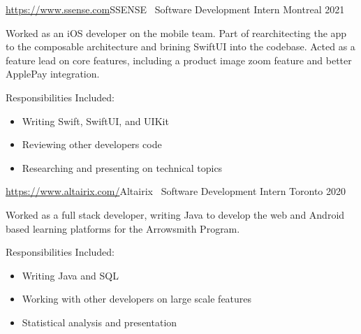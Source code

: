 \documentclass[]{style}
\begin{document}
\begin{entrylist}


\vspace{2mm}

\entry
{\url{https://www.ssense.com}{SSENSE} \ {\normalfont Software Development Intern}\vspace{1mm}}
{Montreal 2021}
{Worked as an iOS developer on the mobile team. Part of rearchitecting the app to the composable architecture and brining SwiftUI into the codebase. Acted as a feature lead on core features, including a product image zoom feature and better ApplePay integration.
~ \vspace{1mm}

Responsibilities Included:

\begin{itemize}
	\item Writing Swift, SwiftUI, and UIKit
	\item Reviewing other developers code
	\item Researching and presenting on technical topics
\end{itemize}}


\vspace{2mm}

\entry
{\url{https://www.altairix.com/}{Altairix} \ {\normalfont Software Development Intern} \vspace{1mm}}
{Toronto 2020}
{Worked as a full stack developer, writing Java to develop the web and Android based learning platforms for the Arrowsmith Program.
~ \vspace{1mm}

Responsibilities Included:

\begin{itemize}
	\item Writing Java and SQL
	\item Working with other developers on large scale features
	\item Statistical analysis and presentation
\end{itemize}}


%
%
%
%
%
%


\end{entrylist}
\end{document}
